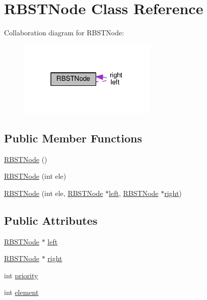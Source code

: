 \hypertarget{classRBSTNode}{}\section{R\+B\+S\+T\+Node Class Reference}
\label{classRBSTNode}


Collaboration diagram for R\+B\+S\+T\+Node\+:
\nopagebreak
\begin{figure}[H]
\begin{center}
\leavevmode
\includegraphics[width=187pt]{classRBSTNode__coll__graph}
\end{center}
\end{figure}
\subsection*{Public Member Functions}
\begin{DoxyCompactItemize}
\item 
\hyperlink{classRBSTNode_a2710c115f70614de3040b2c698e3a9cf}{R\+B\+S\+T\+Node} ()
\item 
\hyperlink{classRBSTNode_a2c0665d4b814a686ba8046d79204b8b3}{R\+B\+S\+T\+Node} (int ele)
\item 
\hyperlink{classRBSTNode_a96186cec6fe0f148c6f33090a9052783}{R\+B\+S\+T\+Node} (int ele, \hyperlink{classRBSTNode}{R\+B\+S\+T\+Node} $\ast$\hyperlink{classRBSTNode_aaed05c0dc1229e3ac9bfd48ca1f34c84}{left}, \hyperlink{classRBSTNode}{R\+B\+S\+T\+Node} $\ast$\hyperlink{classRBSTNode_a086e0e15cf51b06199e205eaeee17086}{right})
\end{DoxyCompactItemize}
\subsection*{Public Attributes}
\begin{DoxyCompactItemize}
\item 
\hyperlink{classRBSTNode}{R\+B\+S\+T\+Node} $\ast$ \hyperlink{classRBSTNode_aaed05c0dc1229e3ac9bfd48ca1f34c84}{left}
\item 
\hyperlink{classRBSTNode}{R\+B\+S\+T\+Node} $\ast$ \hyperlink{classRBSTNode_a086e0e15cf51b06199e205eaeee17086}{right}
\item 
int \hyperlink{classRBSTNode_a834716f43484069f09fb8fabf577b64e}{priority}
\item 
int \hyperlink{classRBSTNode_afe12defb7cc83803252973f1cd797464}{element}
\end{DoxyCompactItemize}


